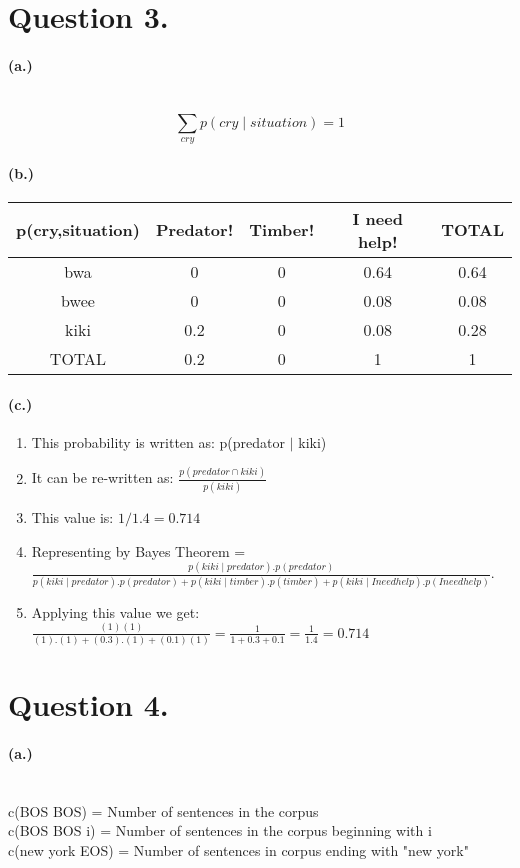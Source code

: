 \documentclass{article}
\begin{document}
\section{Question 3.}
\paragraph{(a.)}
\\$$\sum_{cry} p(cry \mid situation) = 1$$  
\paragraph{(b.)}
\begin{center}
 \begin{tabular}{||c |c |c |c |c ||} 
 \hline
 p(cry,situation) & Predator! & Timber! & I need help! & TOTAL\\ [0.5ex] 
 \hline\hline
 bwa & 0 & 0 & 0.64 & 0.64 \\ 
 \hline
 bwee & 0 & 0 & 0.08 & 0.08 \\
 \hline
 kiki & 0.2 & 0 & 0.08 & 0.28 \\
 \hline
 TOTAL & 0.2 & 0 & 1 & 1 \\ [1ex] 
 \hline
\end{tabular}
\end{center}
\paragraph{(c.)}
\begin{enumerate}
    \item This probability is written as: p(predator $\mid$ kiki)
    \item It can be re-written as: $\frac{p(predator \cap kiki)}{p(kiki)}$
    \item This value is: $1/1.4 = 0.714$
    \item Representing by Bayes Theorem = \\$\frac{p(kiki \mid predator).p(predator)}{p(kiki \mid predator).p(predator)+p(kiki \mid timber).p(timber)+p(kiki \mid I need help).p(I need help)}$.
    \item Applying this value we get: $\frac{(1)(1)}{(1).(1)+(0.3).(1)+(0.1)(1)}=\frac{1}{1+0.3+0.1} = \frac{1}{1.4}= 0.714$ 
\end{enumerate}
\section{Question 4.}
\paragraph{(a.)}
\\c(BOS BOS) = Number of sentences in the corpus
\\c(BOS BOS i) = Number of sentences in the corpus beginning with i
\\c(new york EOS) = Number of sentences in corpus ending with "new york"
\\
\end{document}

